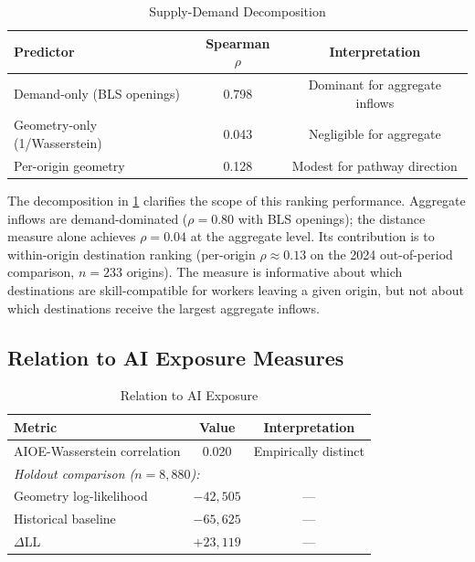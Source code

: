 \documentclass[12pt]{article}
\begin{document}
\begin{table}[h!]
\centering
\caption{Supply-Demand Decomposition}
\label{tab:demand-decomposition}
\begin{tabular}{lcc}
\toprule
\textbf{Predictor} & \textbf{Spearman $\rho$} & \textbf{Interpretation} \\
\midrule
Demand-only (BLS openings) & 0.798 & Dominant for aggregate inflows \\
Geometry-only (1/Wasserstein) & 0.043 & Negligible for aggregate \\
Per-origin geometry & 0.128 & Modest for pathway direction \\
\bottomrule
\end{tabular}
\end{table}


The decomposition in \cref{tab:demand-decomposition} clarifies the scope of this ranking performance. Aggregate inflows are demand-dominated ($\rho = 0.80$ with BLS openings); the distance measure alone achieves $\rho = 0.04$ at the aggregate level. Its contribution is to within-origin destination ranking (per-origin $\rho \approx 0.13$ on the 2024 out-of-period comparison, $n = 233$ origins). The measure is informative about which destinations are skill-compatible for workers leaving a given origin, but not about which destinations receive the largest aggregate inflows.


\subsection{Relation to AI Exposure Measures}
\label{subsec:shock-integration}


\begin{table}[h!]
\centering
\caption{Relation to AI Exposure}
\label{tab:shock-integration}
\begin{tabular}{lcc}
\toprule
\textbf{Metric} & \textbf{Value} & \textbf{Interpretation} \\
\midrule
AIOE-Wasserstein correlation & 0.020 & Empirically distinct \\
\midrule
\multicolumn{3}{l}{\textit{Holdout comparison ($n = 8{,}880$):}} \\
Geometry log-likelihood & $-42{,}505$ & --- \\
Historical baseline & $-65{,}625$ & --- \\
$\Delta$LL & $+23{,}119$ & --- \\
\bottomrule
\end{tabular}
\end{table}
\end{document}
